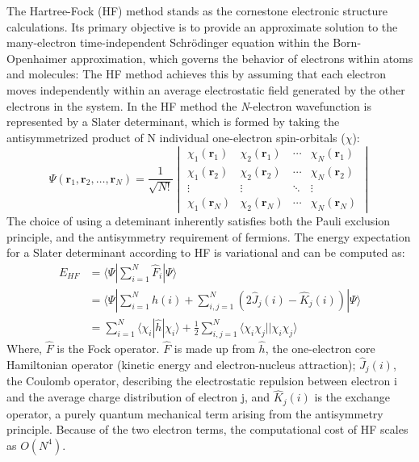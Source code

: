 The Hartree-Fock (HF) method stands as the cornestone electronic structure calculations. Its primary objective is to provide an approximate solution to the many-electron time-independent Schrödinger equation within the Born-Openhaimer approximation, which governs the behavior of electrons within atoms and molecules:
The HF method achieves this by assuming that each electron moves independently within an average electrostatic field generated by the other electrons in the system. In the HF method the \textit{N}-electron wavefunction is represented by a Slater determinant, which is formed by taking the antisymmetrized product of N individual one-electron spin-orbitals ($\chi$):
\begin{equation}\label{eq:SlaterDet}
    \Psi(\mathbf{r}_1, \mathbf{r}_2, \dots, \mathbf{r}_N) = \frac{1}{\sqrt{N!}}
    \begin{vmatrix}
      \chi_1(\mathbf{r}_1) & \chi_2(\mathbf{r}_1) & \cdots & \chi_N(\mathbf{r}_1) \\
      \chi_1(\mathbf{r}_2) & \chi_2(\mathbf{r}_2) & \cdots & \chi_N(\mathbf{r}_2) \\
      \vdots & \vdots & \ddots & \vdots \\
      \chi_1(\mathbf{r}_N) & \chi_2(\mathbf{r}_N) & \cdots & \chi_N(\mathbf{r}_N)
    \end{vmatrix}
  \end{equation}
The choice of using a deteminant inherently satisfies both the Pauli exclusion principle, and the antisymmetry requirement of fermions. The energy expectation for a Slater determinant according to HF is variational and can be computed as:
\begin{equation}\label{EHF}
    \begin{aligned}
        E_{HF} &= \langle \Psi | \sum_{i=1}^{N} \hat{F}_i  | \Psi \rangle \\
            &= \langle \Psi | \sum_{i=1}^{N} \hat{h}(i) + \sum_{i,j=1}^{N} (2\hat{J}_j(i) - \hat{K}_j(i)) | \Psi \rangle\\ 
            &= \sum_{i=1}^{N} \langle \chi_i | \hat{h} | \chi_i \rangle + \frac{1}{2} \sum_{i,j=1}^{N} \langle \chi_i \chi_j || \chi_i \chi_j \rangle
    \end{aligned}
\end{equation}
Where, $\hat{F}$ is the Fock operator. $\hat{F}$ is made up from $\hat{h}$, the one-electron core Hamiltonian operator (kinetic energy and electron-nucleus attraction); $\hat{J}_j(i)$, the Coulomb operator, describing the electrostatic repulsion between electron i and the average charge distribution of electron j, and $\hat{K}_j(i)$ is the exchange operator, a purely quantum mechanical term arising from the antisymmetry principle. Because of the two electron terms, the computational cost of HF scales as $O(N^4)$. \\
